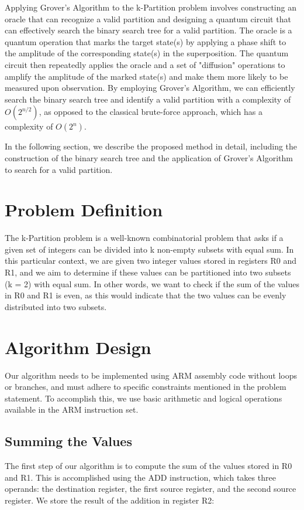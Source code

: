 Applying Grover's Algorithm to the k-Partition problem involves constructing an oracle that can recognize a valid partition and designing a quantum circuit that can effectively search the binary search tree for a valid partition. The oracle is a quantum operation that marks the target state(s) by applying a phase shift to the amplitude of the corresponding state(s) in the superposition. The quantum circuit then repeatedly applies the oracle and a set of "diffusion" operations to amplify the amplitude of the marked state(s) and make them more likely to be measured upon observation. By employing Grover's Algorithm, we can efficiently search the binary search tree and identify a valid partition with a complexity of $O(2^{n/2})$, as opposed to the classical brute-force approach, which has a complexity of $O(2^n)$.

In the following section, we describe the proposed method in detail, including the construction of the binary search tree and the application of Grover's Algorithm to search for a valid partition.

\section{Problem Definition}
The k-Partition problem is a well-known combinatorial problem that asks if a given set of integers can be divided into k non-empty subsets with equal sum. In this particular context, we are given two integer values stored in registers R0 and R1, and we aim to determine if these values can be partitioned into two subsets (k = 2) with equal sum. In other words, we want to check if the sum of the values in R0 and R1 is even, as this would indicate that the two values can be evenly distributed into two subsets.

\section{Algorithm Design}
Our algorithm needs to be implemented using ARM assembly code without loops or branches, and must adhere to specific constraints mentioned in the problem statement. To accomplish this, we use basic arithmetic and logical operations available in the ARM instruction set.

\subsection{Summing the Values}
The first step of our algorithm is to compute the sum of the values stored in R0 and R1. This is accomplished using the ADD instruction, which takes three operands: the destination register, the first source register, and the second source register. We store the result of the addition in register R2:

